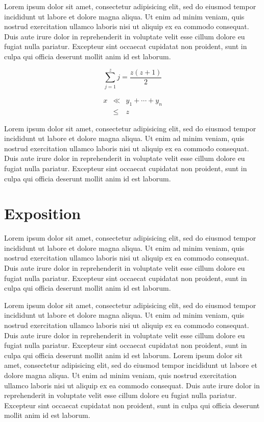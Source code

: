 \documentclass[conference]{acmsiggraph}
\begin{document}
Lorem ipsum dolor sit amet, consectetur adipisicing elit, sed do
eiusmod tempor incididunt ut labore et dolore magna aliqua. Ut enim ad
minim veniam, quis nostrud exercitation ullamco laboris nisi ut
aliquip ex ea commodo consequat. Duis aute irure dolor in
reprehenderit in voluptate velit esse cillum dolore eu fugiat nulla
pariatur. Excepteur sint occaecat cupidatat non proident, sunt in
culpa qui officia deserunt mollit anim id est laborum.

\begin{equation}
 \sum_{j=1}^{z} j = \frac{z(z+1)}{2}
\end{equation}

\begin{eqnarray}
x & \ll & y_{1} + \cdots + y_{n} \\
  & \leq & z
\end{eqnarray}

Lorem ipsum dolor sit amet, consectetur adipisicing elit, sed do
eiusmod tempor incididunt ut labore et dolore magna aliqua. Ut enim ad
minim veniam, quis nostrud exercitation ullamco laboris nisi ut
aliquip ex ea commodo consequat. Duis aute irure dolor in
reprehenderit in voluptate velit esse cillum dolore eu fugiat nulla
pariatur. Excepteur sint occaecat cupidatat non proident, sunt in
culpa qui officia deserunt mollit anim id est laborum.

\section{Exposition}

Lorem ipsum dolor sit amet, consectetur adipisicing elit, sed do
eiusmod tempor incididunt ut labore et dolore magna aliqua. Ut enim ad
minim veniam, quis nostrud exercitation ullamco laboris nisi ut
aliquip ex ea commodo consequat. Duis aute irure dolor in
reprehenderit in voluptate velit esse cillum dolore eu fugiat nulla
pariatur. Excepteur sint occaecat cupidatat non proident, sunt in
culpa qui officia deserunt mollit anim id est laborum.

Lorem ipsum dolor sit amet, consectetur adipisicing elit, sed do
eiusmod tempor incididunt ut labore et dolore magna aliqua. Ut enim ad
minim veniam, quis nostrud exercitation ullamco laboris nisi ut
aliquip ex ea commodo consequat. Duis aute irure dolor in
reprehenderit in voluptate velit esse cillum dolore eu fugiat nulla
pariatur. Excepteur sint occaecat cupidatat non proident, sunt in
culpa qui officia deserunt mollit anim id est laborum.
Lorem ipsum dolor sit amet, consectetur adipisicing elit, sed do
eiusmod tempor incididunt ut labore et dolore magna aliqua. Ut enim ad
minim veniam, quis nostrud exercitation ullamco laboris nisi ut
aliquip ex ea commodo consequat. Duis aute irure dolor in
reprehenderit in voluptate velit esse cillum dolore eu fugiat nulla
pariatur. Excepteur sint occaecat cupidatat non proident, sunt in
culpa qui officia deserunt mollit anim id est laborum.
\end{document}
